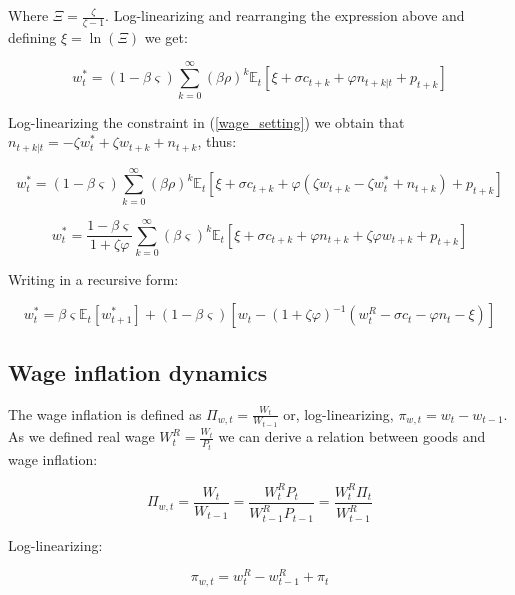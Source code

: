\documentclass{article}
\newcommand{\Et}{\mathbb{E}_t}
\begin{document}
Where $\Xi = \frac{\zeta}{\zeta-1}$. Log-linearizing and rearranging the expression above and defining $\xi = \ln(\Xi)$ we get:

\begin{equation}
    w_t^* = (1 - \beta \varsigma) \sum^\infty_{k=0} (\beta \rho)^k \Et[\xi +  \sigma c_{t+k} + \varphi n_{t+k|t} + p_{t+k}]
\end{equation}


Log-linearizing the constraint in (\ref{wage_setting}) we obtain that $n_{t+k|t} = -\zeta w_t^* + \zeta w_{t+k} + n_{t+k}$, thus:

\begin{equation}
    w_t^* = (1 - \beta \varsigma) \sum^\infty_{k=0} (\beta \rho)^k \Et[\xi +  \sigma c_{t+k} + \varphi( \zeta w_{t+k} -\zeta w_t^* + n_{t+k}) + p_{t+k}]
\end{equation}

\begin{equation}
    w_t^* = \frac{1-\beta \varsigma}{1 + \zeta \varphi} \sum^{\infty}_{k=0} (\beta \varsigma)^k \Et[\xi + \sigma c_{t+k} + \varphi n_{t+k} + \zeta \varphi w_{t+k} + p_{t+k}]
\end{equation}

Writing in a recursive form:

\begin{equation}
    \label{opt_wage}
    w_t^* = \beta \varsigma \Et[w^*_{t+1}] + (1 - \beta \varsigma) \left[w_t - (1+\zeta \varphi)^{-1} (w_t^R  - \sigma c_t - \varphi n_t - \xi) \right]
\end{equation}

\subsection{Wage inflation dynamics}
The wage inflation is defined as $\Pi_{w,t} = \frac{W_t}{W_{t-1}}$ or, log-linearizing, $\pi_{w,t} = w_t - w_{t-1}$. As we defined real wage $W_t^R = \frac{W_t}{P_t}$ we can derive a relation between goods and wage inflation:

\begin{equation}
    \Pi_{w,t} = \frac{W_t}{W_{t-1}} = \frac{W_t^R P_t}{W_{t-1}^R P_{t-1}} = \frac{W_t^R \Pi_t}{W_{t-1}^R}
\end{equation}

Log-linearizing:

\begin{equation}
    \label{wage_inflation}
    \pi_{w,t} = w_t^R - w_{t-1}^R + \pi_t
\end{equation}
\end{document}
